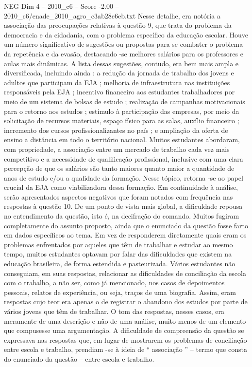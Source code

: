 \begin{textsample}{NEG Dim 4 – 2010\_c6 – Score -2.00 – 2010\_c6/enade\_2010\_agro\_c3ab28c6eb.txt}
Nesse detalhe, era notória a associação das preocupações relativas à questão 9, que trata do problema da democracia e da cidadania, com o problema específico da educação escolar.
Houve um número significativo de sugestões ou propostas para se combater o problema da repetência e da evasão, destacando -se melhores salários para os professores e aulas mais dinâmicas.
A lista dessas sugestões, contudo, era bem mais ampla e diversificada, incluindo ainda : a redução da jornada de trabalho dos jovens e adultos que participam da EJA ; melhoria de infraestrutura nas instituições responsáveis pela EJA ; incentivo financeiro aos estudantes trabalhadores por meio de um sistema de bolsas de estudo ; realização de campanhas motivacionais para o retorno aos estudos ; estímulo à participação das empresas, por meio da solicitação de recursos materiais, espaço físico para as salas, auxílio financeiro ; incremento dos cursos profissionalizantes no país ; e ampliação da oferta de ensino a distância em todo o território nacional.
Muitos estudantes abordaram, com propriedade, a associação entre um mercado de trabalho cada vez mais competitivo e a necessidade de qualificação profissional, inclusive com uma clara percepção de que os salários são tanto maiores quanto maior a quantidade de anos de estudo e/ou a qualidade da formação.
Nesse tópico, retorna -se ao papel crucial da EJA como viabilizadora dessa formação.
Em continuidade à análise, serão apresentados aspectos negativos que foram notados com frequência nas respostas à questão 10.
De um ponto de vista mais global, a dificuldade repousa no entendimento da questão, isto é, na decifração do comando.
Muitos fugiram completamente do assunto proposto, ainda que o enunciado da questão fosse farto em dados específicos ao tema.
Em vez de responderem diretamente quais eram os problemas enfrentados por aqueles que têm de trabalhar e estudar ao mesmo tempo, muitos estudantes optavam por falar das dificuldades que existem na educação brasileira, de forma estendida e pasteurizada.
Vários estudantes não conseguiam, em suas respostas, relacionar as dificuldades de conciliação da escola com o trabalho, a não ser, como já mencionado, nos casos de depoimentos pessoais, relatos de experiência, ou seja, traços de uma biografia.
Assim, eram respostas cujo teor era apenas o de registrar o abandono dos estudos por parte de vários jovens que têm de trabalhar.
O tom das respostas, nesses casos, era meramente de uma descrição e não de uma análise, muito menos de um elemento que compusesse uma argumentação.
A dificuldade de compreensão da questão se expressava nas respostas que, em lugar de mostrarem os problemas de conciliação entre escola e trabalho, prendiam -se à ideia de “ associação ” – termo que consta do enunciado da questão – entre escola e trabalho.

\end{textsample}
